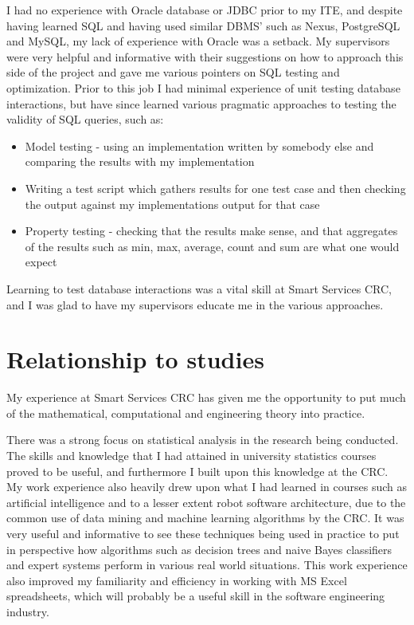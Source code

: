 \documentclass{report}
\begin{document}
I had no experience with Oracle database or JDBC prior to my ITE, and despite having learned SQL and having used similar DBMS' such as Nexus, PostgreSQL and MySQL, my lack of experience with Oracle was a setback. My supervisors were very helpful and informative with their suggestions on how to approach this side of the project and gave me various pointers on SQL testing and optimization. Prior to this job I had minimal experience of unit testing database interactions, but have since learned various pragmatic approaches to testing the validity of SQL queries, such as:
\begin{itemize}
  \item Model testing - using an implementation written by somebody else and comparing the results with my implementation
  \item Writing a test script which gathers results for one test case and then checking the output against my implementations output for that case
  \item Property testing - checking that the results make sense, and that aggregates of the results such as min, max, average, count and sum are what one would expect
\end{itemize}

Learning to test database interactions was a vital skill at Smart Services CRC, and I was glad to have my supervisors educate me in the various approaches.


\chapter{Relationship to studies}
My experience at Smart Services CRC has given me the opportunity to put much of the mathematical, computational and engineering theory into practice.

There was a strong focus on statistical analysis in the research being conducted. The skills and knowledge that I had attained in university statistics courses proved to be useful, and furthermore I built upon this knowledge at the CRC. My work experience also heavily drew upon what I had learned in courses such as artificial intelligence and to a lesser extent robot software architecture, due to the common use of data mining and machine learning algorithms by the CRC. It was very useful and informative to see these techniques being used in practice to put in perspective how algorithms such as decision trees and naive Bayes classifiers and expert systems perform in various real world situations. This work experience also improved my familiarity and efficiency in working with MS Excel spreadsheets, which will probably be a useful skill in the software engineering industry.
\end{document}
